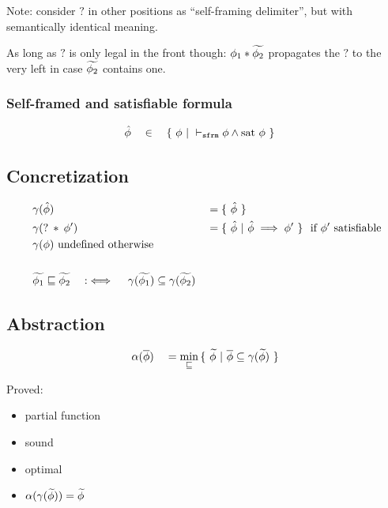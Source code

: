 \documentclass[11pt,a4paper]{article}
\begin{document}
Note: consider $?$ in other positions as ``self-framing delimiter'', but with semantically identical meaning.

As long as $?$ is only legal in the front though: $\phi_1 * \widetilde{\phi_2}$ propagates the $?$ to the very left in case $\widetilde{\phi_2}$ contains one.

\subsubsection{Self-framed and satisfiable formula}
\begin{align*}
&\hat{\phi} \quad \in \quad \{~ \phi ~|~ \vdash_\texttt{sfrm} \phi \wedge \text{sat~} \phi ~\}
\end{align*}

\subsection{Concretization}
\begin{align*}
&\gamma(\hat{\phi}) ~&&= \{~ \hat{\phi} ~\} \\
&\gamma(?\:*\:\phi') ~&&= \{~ \hat{\phi} ~|~ \hat{\phi} \implies \phi' ~\} \text{~~if $\phi'$ satisfiable} \\
&\gamma(\phi) \text{ undefined otherwise} \\
~\\
&\widetilde{\phi_1} \sqsubseteq \widetilde{\phi_2} \quad:\iff\quad \gamma(\widetilde{\phi_1}) \subseteq \gamma(\widetilde{\phi_2})
\end{align*}



\subsection{Abstraction}
\begin{align*}
&\alpha(\overline{\phi}) &&= \min_{\sqsubseteq} {\{~ \widetilde{\phi} ~|~ \overline{\phi} \subseteq \gamma(\widetilde{\phi}) ~\}}\\
\end{align*}

Proved:
\begin{itemize}
	\item partial function
	\item sound
	\item optimal
	\item $\alpha(\gamma(\widetilde{\phi})) = \widetilde{\phi}$
\end{itemize}

\end{document}
